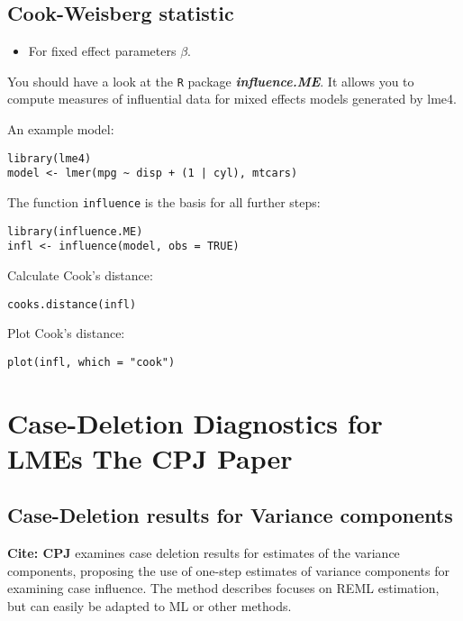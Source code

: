 \subsection{Cook-Weisberg statistic} %
\begin{itemize}
\item For fixed effect parameters $\beta$.
\end{itemize}





You should have a look at the \texttt{R} package \textit{\textbf{influence.ME}}. It allows you to compute measures of influential data for mixed effects models generated by lme4.

An example model:
\begin{verbatim}
library(lme4)
model <- lmer(mpg ~ disp + (1 | cyl), mtcars)
\end{verbatim}

The function \texttt{influence} is the basis for all further steps:

\begin{verbatim}
library(influence.ME)
infl <- influence(model, obs = TRUE)
\end{verbatim}
Calculate Cook's distance:
\begin{verbatim}
cooks.distance(infl)
\end{verbatim}
Plot Cook's distance:
\begin{verbatim}
plot(infl, which = "cook")
\end{verbatim}
\newpage

\section{Case-Deletion Diagnostics for LMEs The CPJ Paper}%

\subsection{Case-Deletion results for Variance components}
\textbf{Cite: CPJ}  examines case deletion results for estimates of the variance components, proposing the use of one-step estimates of variance components for examining case influence. The method describes focuses on REML estimation, but can easily be adapted to ML or other methods.

